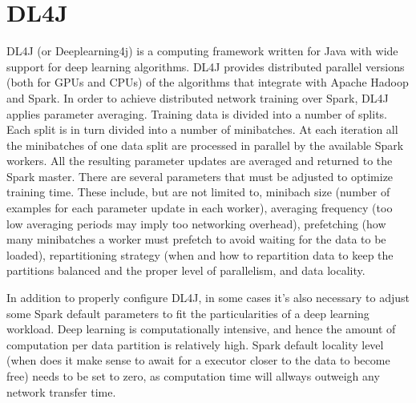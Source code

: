 \documentclass[journal]{IEEEtran}
\begin{document}

\section{DL4J}
\label{sec:spark}
DL4J (or Deeplearning4j) is a computing framework written for Java with wide support for deep learning algorithms. DL4J provides distributed parallel versions (both for GPUs and CPUs) of the algorithms that integrate with Apache Hadoop and Spark. In order to achieve distributed network training over Spark, DL4J applies parameter averaging. Training data is divided into a number of splits. Each split is in turn divided into a number of minibatches. At each iteration all the minibatches of one data split are processed in parallel by the available Spark workers. All the resulting parameter updates are averaged and returned to the Spark master. There are several parameters that must be adjusted to optimize training time. These include, but are not limited to, minibach size (number of examples for each parameter update in each worker), averaging frequency (too low averaging periods may imply too networking overhead), prefetching (how many minibatches a worker must prefetch to avoid waiting for the data to be loaded), repartitioning strategy (when and how to repartition data to keep the partitions balanced and the proper level of parallelism, and data locality. 

In addition to properly configure DL4J, in some cases it's also necessary to adjust some Spark default parameters to fit the particularities of a deep learning workload. Deep learning is computationally intensive, and hence the amount of computation per data partition is relatively high. Spark default locality level (when does it make sense to await for a executor closer to the data to become free) needs to be set to zero, as computation time will allways outweigh any network transfer time.  
\end{document}
